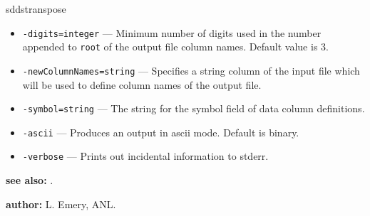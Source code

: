 \begin{sddsprog}{sddstranspose}
\begin{itemize}
      \item \verb|-digits=integer| --- Minimum number of digits used in the number appended to \verb|root| of the output file column names. Default value is 3.
      \item \verb|-newColumnNames=string| --- Specifies a string column of the input file which will be used to define column names of the output file.
      \item \verb|-symbol=string| --- The string for the symbol field of data column definitions.
      \item \verb|-ascii| --- Produces an output in ascii mode. Default is binary.
      \item \verb|-verbose| --- Prints out incidental information to stderr.
    \end{itemize}
  \item \textbf{see also:} .
  \item \textbf{author:} L. Emery, ANL.
\end{sddsprog}

